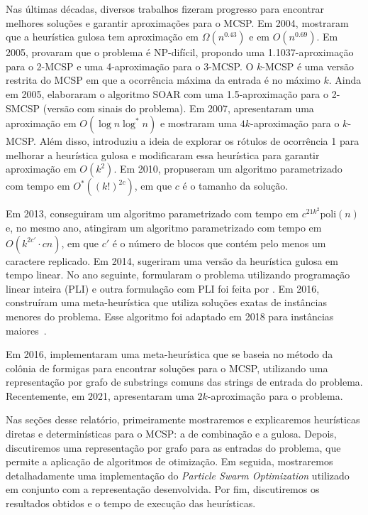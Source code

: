 Nas últimas décadas, diversos trabalhos fizeram progresso para encontrar melhores soluções e garantir aproximações para o MCSP. Em 2004, \textcite{chrobak_greedy_2004} mostraram que a heurística gulosa tem aproximação em $\Omega(n^{0.43})$ e em $O(n^{0.69})$. Em 2005, \textcite{goldstein_minimum_2005} provaram que o problema é NP-difícil, propondo uma 1.1037-aproximação para o 2-MCSP e uma 4-aproximação para o 3-MCSP. O $k$-MCSP é uma versão restrita do MCSP em que a ocorrência máxima da entrada é no máximo $k$. Ainda em 2005, \textcite{chen_assignment_2005} elaboraram o algoritmo SOAR com uma 1.5-aproximação para o 2-SMCSP (versão com sinais do problema). Em 2007, \textcite{cormode_string_2007} apresentaram uma aproximação em $O(\log n \log^* n)$ e \textcite{kolman_reversal_2007} mostraram uma $4k$-aproximação para o $k$-MCSP. Além disso, \textcite{mandoiu_novel_2007} introduziu a ideia de explorar os rótulos de ocorrência 1 para melhorar a heurística gulosa e \textcite{kolman_approximating_2007} modificaram essa heurística para garantir aproximação em $O(k^2)$. Em 2010, \textcite{jiang_minimum_2012} propuseram um algoritmo parametrizado com tempo em $O^*((k!)^{2c})$, em que $c$ é o tamanho da solução.

Em 2013, \textcite{bulteau_minimum_2014} conseguiram um algoritmo parametrizado com tempo em $c^{21k^2} \text{poli}(n)$ e, no mesmo ano, \textcite{bulteau_fixed-parameter_2013} atingiram um algoritmo parametrizado com tempo em $O(k^{2c'} \cdot cn)$, em que $c'$ é o número de blocos que contém pelo menos um caractere replicado. Em 2014, \textcite{goldstein_quick_2014} sugeriram uma versão da heurística gulosa em tempo linear. No ano seguinte, \textcite{blum_mathematical_2015} formularam o problema utilizando programação linear inteira (PLI) e outra formulação com PLI foi feita por \textcite{blum_computational_2016}. Em 2016, \textcite{blum_construct_2016} construíram uma meta-heurística que utiliza soluções exatas de instâncias menores do problema. Esse algoritmo foi adaptado em 2018 para instâncias maiores~\cite{blum_minimum_2018}.

Em 2016, \textcite{ferdous_solving_2017} implementaram uma meta-heurística que se baseia no método da colônia de formigas para encontrar soluções para o MCSP, utilizando uma representação por grafo de substrings comuns das strings de entrada do problema. Recentemente, em 2021, \textcite{siqueira_signed_2023} apresentaram uma $2k$-aproximação para o problema.

Nas seções desse relatório, primeiramente mostraremos e explicaremos heurísticas diretas e determinísticas para o MCSP: a de combinação e a gulosa. Depois, discutiremos uma representação por grafo para as entradas do problema, que permite a aplicação de algoritmos de otimização. Em seguida, mostraremos detalhadamente uma implementação do \textit{Particle Swarm Optimization} utilizado em conjunto com a representação desenvolvida. Por fim, discutiremos os resultados obtidos e o tempo de execução das heurísticas.
